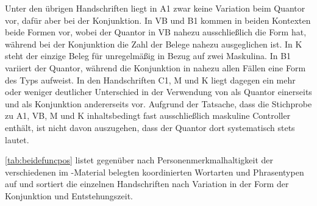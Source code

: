 Unter den übrigen Handschriften liegt in A1 zwar keine Variation
beim Quantor vor, dafür aber bei der Konjunktion. In VB und
B1 kommen in beiden Kontexten beide Formen vor, wobei der Quantor in
VB nahezu ausschließlich die Form  hat, während bei der
Konjunktion die Zahl der Belege nahezu ausgeglichen ist. In K steht
der einzige Beleg für  unregelmäßig in Bezug auf zwei Maskulina.
In B1 variiert der Quantor, während die Konjunktion in nahezu allen
Fällen eine Form des Typs  aufweist. In den Handschriften
C1, M und K liegt dagegen ein mehr oder
weniger deutlicher Unterschied in der Verwendung von  als Quantor
einerseits und  als Konjunktion andererseits vor. Aufgrund der
Tatsache, dass die Stichprobe zu A1, VB, M und
K inhaltsbedingt fast ausschließlich maskuline Controller enthält,
ist nicht davon auszugehen, dass der Quantor dort systematisch stets
 lautet.


\cref{tab:beidefuncpos} listet  gegenüber  nach
Personenmerkmalhaltigkeit der verschiedenen im \KC{}-Material belegten
koordinierten Wortarten und Phrasentypen auf und sortiert die einzelnen
Handschriften nach Variation in der Form der Konjunktion und Entstehungszeit.

